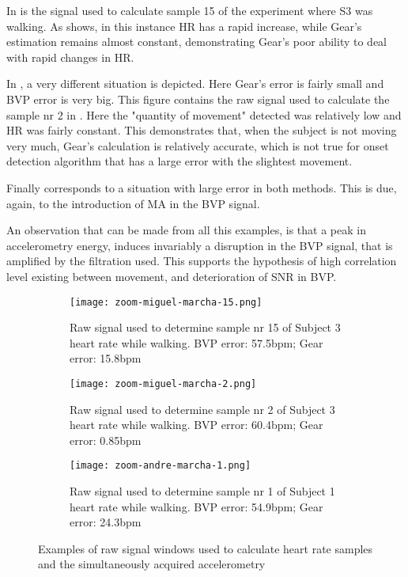 In  is the signal used to calculate sample 15 of the experiment where S3 was walking. As  shows, in this instance HR has a rapid increase, while Gear's estimation remains almost constant, demonstrating Gear's poor ability to deal with rapid changes in HR. 

In , a very different situation is depicted. Here Gear's error is fairly small and BVP error is very big. This figure contains the raw signal used to calculate the sample nr 2 in . Here the "quantity of movement" detected was relatively low and HR was fairly constant. This demonstrates that, when the subject is not moving very much, Gear's calculation is relatively accurate, which is not true for onset detection algorithm that has a large error with the slightest movement.

Finally  corresponds to a situation with large error in both methods. This is due, again, to the introduction of MA in the BVP signal.

An observation that can be made from all this examples, is that a peak in accelerometry energy, induces invariably a disruption in the BVP signal, that is amplified by the filtration used. This supports the hypothesis of high correlation level existing between movement, and deterioration of SNR in BVP.



\begin{figure}[!h]
	\centering
	\begin{subfigure}[t]{0.5\textwidth}
		\centering
		\captionsetup{width=.8\linewidth}
		\texttt{[image: zoom-miguel-marcha-15.png]}
		\caption{Raw signal used to determine sample nr 15 of Subject 3 heart rate while walking. BVP error: 57.5bpm; Gear error: 15.8bpm}
		\label{fig:zoom1}
	\end{subfigure}%
	\begin{subfigure}[t]{0.5\textwidth}
		\centering
		\captionsetup{width=.8\linewidth}
		\texttt{[image: zoom-miguel-marcha-2.png]}
		\caption{Raw signal used to determine sample nr 2 of Subject 3 heart rate while walking. BVP error: 60.4bpm; Gear error: 0.85bpm}
		\label{fig:zoom2}
	\end{subfigure}%
	\vskip 8pt
	\begin{subfigure}[t]{0.5\textwidth}
		\centering
		\captionsetup{width=.8\linewidth}
		\texttt{[image: zoom-andre-marcha-1.png]}
		\caption{Raw signal used to determine sample nr 1 of Subject 1 heart rate while walking. BVP error: 54.9bpm; Gear error: 24.3bpm}
		\label{fig:zoom3}
	\end{subfigure}%
	
	\caption{Examples of raw signal windows used to calculate heart rate samples and the simultaneously acquired accelerometry}
	\label{fig:zoom}
\end{figure}



